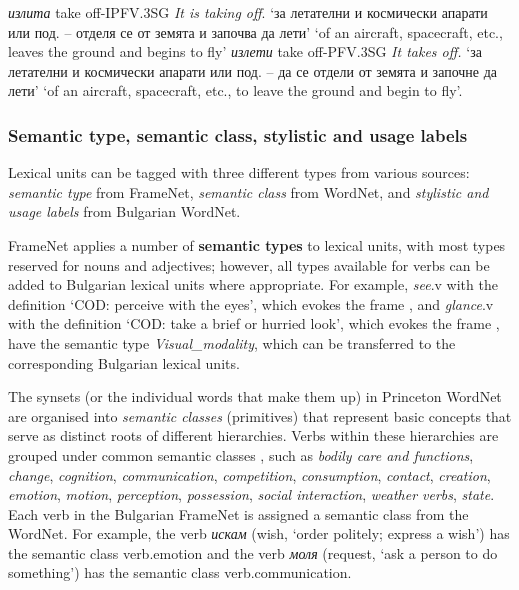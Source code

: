 \documentclass[output=paper,colorlinks,citecolor=brown]{langscibook}
\begin{document}
\ea \emph{излита} \hspace{0.5cm} take off-IPFV.3SG \hspace{0.5cm}  \textit{It is taking off}.
\glt `за летателни и космически апарати или под. -- отделя се от земята и започва да лети'
\glt `of an aircraft, spacecraft, etc., leaves the ground and begins to fly' 
\ex \emph{излети}  \hspace{0.5cm}  take off-PFV.3SG \hspace{0.5cm}  \textit{It takes off.}
\glt `за летателни и космически апарати или под. -- да се отдели от земята и започне да лети' 
\glt `of an aircraft, spacecraft, etc., to leave the ground and begin to fly'.
\z

\subsubsection{Semantic type, semantic class, stylistic and usage labels}

Lexical units can be tagged with three different types from various sources: \emph{semantic type} from FrameNet, \emph{semantic class} from WordNet, and \emph{stylistic and usage labels} from Bulgarian WordNet.

FrameNet applies a number of \textbf{semantic types} to lexical units, with most types reserved for nouns and adjectives; however, all types available for verbs can be added to Bulgarian lexical units where appropriate. For example, \textit{see}.v with the definition `COD: perceive with the eyes', which evokes the frame , and \textit{glance}.v with the definition `COD: take a brief or hurried look', which evokes the frame , have the semantic type \emph{Visual\_modality}, which can be transferred to the corresponding Bulgarian lexical units.

The synsets (or the individual words that make them up) in Princeton WordNet are organised into \emph{semantic classes} (primitives) that represent basic concepts that serve as distinct roots of different hierarchies. Verbs within these hierarchies are grouped under common semantic classes \citep[47]{fellbaum1993}, such as \textit{bodily care and functions}, \textit{change}, \textit{cognition}, \textit{communication}, \textit{competition}, \textit{consumption}, \textit{contact}, \textit{creation}, \textit{emotion}, \textit{motion}, \textit{perception}, \textit{possession}, \textit{social interaction}, \textit{weather verbs}, \textit{state}.
Each verb in the Bulgarian FrameNet is assigned a semantic class from the WordNet. For example, the verb \textit{искам} (wish, `order politely; express a wish') has the semantic class verb.emotion and the verb \textit{моля} (request, `ask a person to do something') has the semantic class verb.communication.
\end{document}

